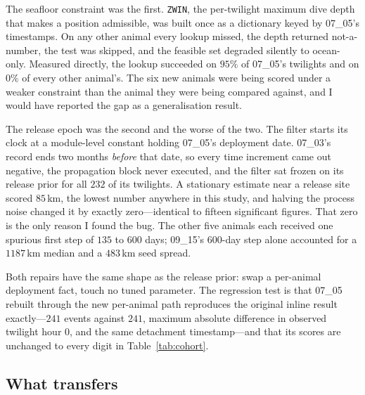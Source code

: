 \documentclass[conference]{IEEEtran}
\begin{document}
The seafloor constraint was the first. \texttt{ZWIN}, the per-twilight maximum
dive depth that makes a position admissible, was built once as a dictionary
keyed by 07\_05's timestamps. On any other animal every lookup missed, the
depth returned not-a-number, the test was skipped, and the feasible set
degraded silently to ocean-only. Measured directly, the lookup succeeded on
$95\%$ of 07\_05's twilights and on $0\%$ of every other animal's. The six new
animals were being scored under a weaker constraint than the animal they were
being compared against, and I would have reported the gap as a generalisation
result.

The release epoch was the second and the worse of the two. The filter starts
its clock at a module-level constant holding 07\_05's deployment date. 07\_03's
record ends two months \emph{before} that date, so every time increment came
out negative, the propagation block never executed, and the filter sat frozen
on its release prior for all $232$ of its twilights. A stationary estimate near
a release site scored $85$\,\si{\km}, the lowest number anywhere in this study,
and halving the process noise changed it by exactly zero---identical to fifteen
significant figures. That zero is the only reason I found the bug. The other
five animals each received one spurious first step of $135$ to $600$ days;
09\_15's $600$-day step alone accounted for a $1187$\,\si{\km} median and a
$483$\,\si{\km} seed spread.

Both repairs have the same shape as the release prior: swap a per-animal
deployment fact, touch no tuned parameter. The regression test is that 07\_05
rebuilt through the new per-animal path reproduces the original inline result
exactly---$241$ events against $241$, maximum absolute difference in observed
twilight hour $0$, and the same detachment timestamp---and that its scores are
unchanged to every digit in Table~\ref{tab:cohort}.

\subsection{What transfers}
\end{document}
